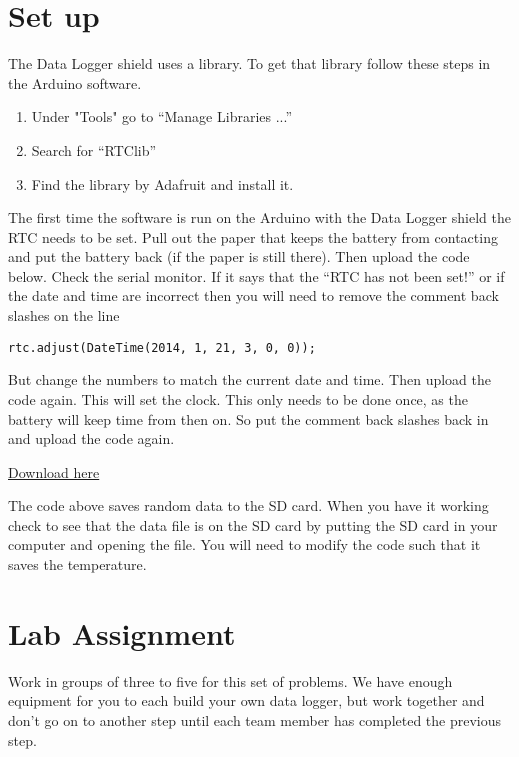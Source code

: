 \section{Set up}
	The Data Logger shield uses a library. To get that library follow these steps in the Arduino software.
	\begin{enumerate}
		\item Under "Tools" go to ``Manage Libraries ...''
		\item Search for ``RTClib''
		\item Find the library by Adafruit and install it.
	\end{enumerate}

    The first time the software is run on the Arduino with the Data Logger shield the RTC needs to be set.  Pull out the paper that keeps the battery from contacting  and put the battery back (if the paper is still there). Then upload the code below. Check the serial monitor. If it says that the ``RTC has not been set!'' or if the date and time are incorrect then you will need to remove the comment back slashes on the line 
    \begin{lstlisting}[language=Arduino]
   		 rtc.adjust(DateTime(2014, 1, 21, 3, 0, 0));
    \end{lstlisting}
    But change the numbers to match the current date and time. Then upload the code again. This will set the clock. This only needs to be done once, as the battery will keep time from then on. So put the comment back slashes back in and upload the code again.

\href{https://dtoliphant.github.io/PH250Manual/Code/DataLog.ino}{Download here}



The code above saves random data to the SD card. When you have it working check to see that the data file is on the SD card by putting the SD card in your computer and opening the file.  You will need to modify the code such that it saves the temperature.




\section{Lab Assignment}
	
	Work in groups of three to five for this set of problems. We have enough equipment for you to each build your own data logger, but work together and don't go on to another step until each team member has completed the previous step.
	
